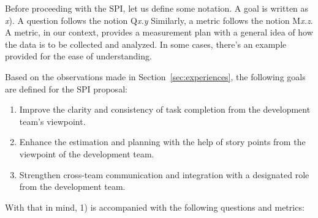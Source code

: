 \documentclass[conference]{IEEEtran}
\begin{document}
Before proceeding with the SPI, let us define some notation. A goal is written
as \textit{x}). A question follows the notion Q\textit{x.y} Similarly, a metric
follows the notion M\textit{x.z}. A metric, in our context, provides a
measurement plan with a general idea of how the data is to be collected and
analyzed. In some cases, there's an example provided for the ease of
understanding.

Based on the observations made in Section~\ref{sec:experiences}, the following
goals are defined for the SPI proposal:

\begin{enumerate}
  \item Improve the clarity and consistency of task completion from the
    development team’s viewpoint.
  \item Enhance the estimation and planning with the help of story points
    from the viewpoint of the development team. 
  \item Strengthen cross-team communication and integration with a
    designated role from the development team. 
\end{enumerate}

With that in mind, 1) is accompanied with the following questions and metrics:
\end{document}
